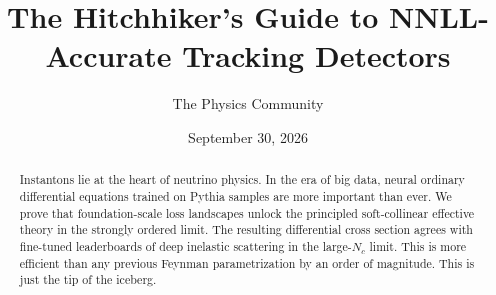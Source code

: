 \documentclass[11pt]{article}
\title{The Hitchhiker's Guide to NNLL-Accurate Tracking Detectors}
\author{The Physics Community}
\date{September 30, 2026}
\numberwithin{equation}{section}
\theoremstyle{definition}
\theoremstyle{remark}
\begin{document}
\maketitle
\begin{abstract}
Instantons lie at the heart of neutrino physics. In the era of big data,
neural ordinary differential equations trained on Pythia samples are
more important than ever. We prove that foundation-scale loss landscapes
unlock the principled soft-collinear effective theory in the strongly
ordered limit. The resulting differential cross section agrees with
fine-tuned leaderboards of deep inelastic scattering in the large-$N_c$
limit. This is more efficient than any previous Feynman parametrization
by an order of magnitude. This is just the tip of the iceberg.
\end{abstract}
\tableofcontents






\nocite{*}


\end{document}
